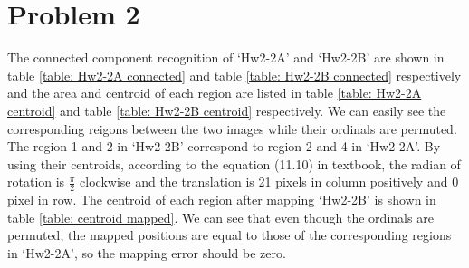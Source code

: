 \documentclass[a4paper]{article}
\begin{document}
\restoregeometry

\section{Problem 2}
The connected component recognition of `Hw2-2A' and `Hw2-2B' are shown in table \ref{table: Hw2-2A connected} and table \ref{table: Hw2-2B connected} respectively and the area and centroid of each region are listed in table \ref{table: Hw2-2A centroid} and table \ref{table: Hw2-2B centroid} respectively. We can easily see the corresponding reigons between the two images while their ordinals are permuted. The region 1 and 2 in `Hw2-2B' correspond to region 2 and 4 in `Hw2-2A'. By using their centroids, according to the equation (11.10) in textbook, the radian of rotation is $\frac{\pi}{2}$ clockwise and the translation is 21 pixels in column positively and 0 pixel in row. The centroid of each region after mapping `Hw2-2B' is shown in table \ref{table: centroid mapped}. We can see that even though the ordinals are permuted, the mapped positions are equal to those of the corresponding regions in `Hw2-2A', so the mapping error should be zero.
\end{document}

